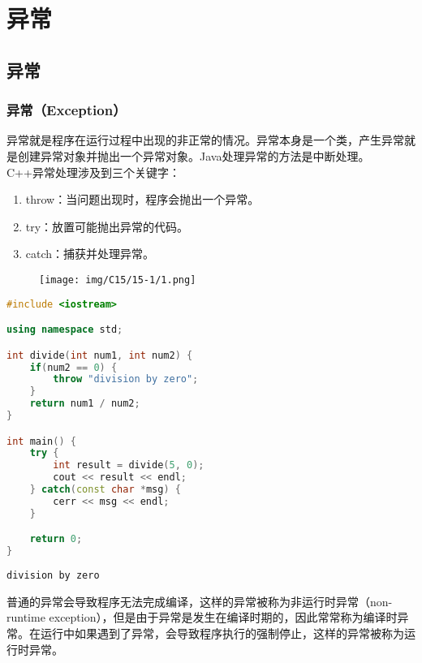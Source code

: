 \chapter{异常}

\section{异常}

\subsection{异常（Exception）}

异常就是程序在运行过程中出现的非正常的情况。异常本身是一个类，产生异常就是创建异常对象并抛出一个异常对象。Java处理异常的方法是中断处理。\\

C++异常处理涉及到三个关键字：

\begin{enumerate}
	\item throw：当问题出现时，程序会抛出一个异常。
	\item try：放置可能抛出异常的代码。
	\item catch：捕获并处理异常。
\end{enumerate}

\begin{figure}[H]
	\centering
	\texttt{[image: img/C15/15-1/1.png]}
\end{figure}


\begin{lstlisting}[language=C++]
#include <iostream>

using namespace std;

int divide(int num1, int num2) {
    if(num2 == 0) {
        throw "division by zero";
    }
    return num1 / num2;
}

int main() {
    try {
        int result = divide(5, 0);
        cout << result << endl;
    } catch(const char *msg) {
        cerr << msg << endl;
    }

    return 0;
}
\end{lstlisting}

\begin{tcolorbox}
	\begin{verbatim}
division by zero
	\end{verbatim}
\end{tcolorbox}

普通的异常会导致程序无法完成编译，这样的异常被称为非运行时异常（non-runtime exception），但是由于异常是发生在编译时期的，因此常常称为编译时异常。在运行中如果遇到了异常，会导致程序执行的强制停止，这样的异常被称为运行时异常。

